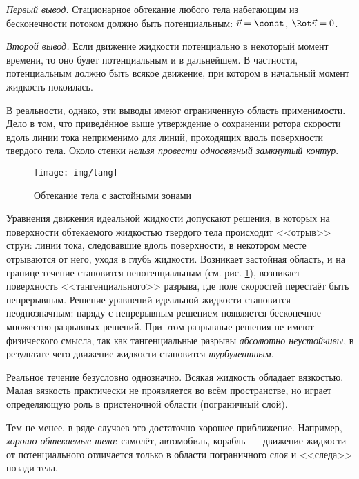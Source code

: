 \vspace{0.5em}
\textit{Первый вывод.} Стационарное обтекание любого тела набегающим из бесконечности потоком должно быть потенциальным: $\vec{v} = \const$, $\Rot\vec{v} = 0$.
\vspace{0.5em}

\textit{Второй вывод.} Если движение жидкости потенциально в некоторый момент времени, то оно будет потенциальным и в дальнейшем. В частности, потенциальным должно быть всякое движение, при котором в начальный момент жидкость покоилась.
\vspace{0.5em}

В реальности, однако, эти выводы имеют ограниченную область применимости. Дело в том, что приведённое выше утверждение о сохранении ротора скорости вдоль линии тока неприменимо для линий, проходящих вдоль поверхности твердого тела. Около стенки \textit{нельзя провести односвязный замкнутый контур}.
\begin{figure}[H]
	\centering
	\texttt{[image: img/tang]}
	\caption{Обтекание тела с застойными зонами}
	\label{fig:figure14}
\end{figure}
Уравнения движения идеальной жидкости допускают решения, в которых на поверхности обтекаемого жидкостью твердого тела происходит <<отрыв>> струи: линии тока, следовавшие вдоль поверхности, в некотором месте отрываются от него, уходя в глубь жидкости. Возникает застойная область, и на границе течение становится непотенциальным (см. рис. \ref{fig:figure14}), возникает поверхность <<тангенциального>> разрыва, где поле скоростей перестаёт быть непрерывным.
Решение уравнений идеальной жидкости становится неоднозначным: наряду с непрерывным решением появляется бесконечное множество разрывных решений. При этом разрывные решения не имеют физического смысла, так как тангенциальные разрывы \textit{абсолютно неустойчивы}, в результате чего движение жидкости становится \textit{турбулентным}.

Реальное течение безусловно однозначно. Всякая жидкость обладает вязкостью. Малая вязкость практически не проявляется во всём пространстве, но играет определяющую роль в пристеночной области (пограничный слой).

Тем не менее, в ряде случаев это достаточно хорошее приближение.  Например, \textit{хорошо обтекаемые тела}: самолёт, автомобиль, корабль~--- движение жидкости от потенциального отличается только в области пограничного слоя и <<следа>> позади тела.

